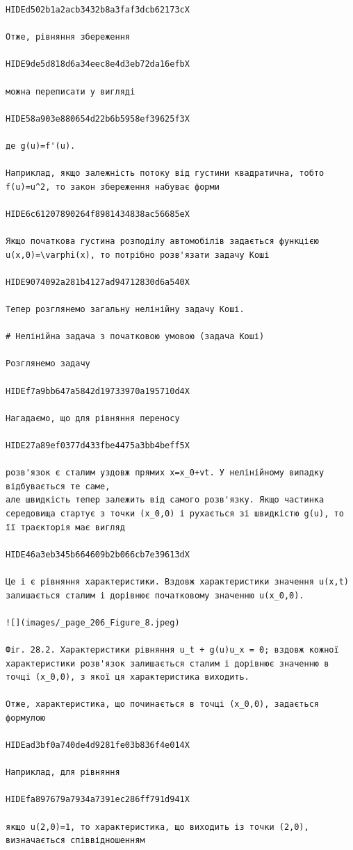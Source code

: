 \documentclass[
  ukrainian,
]{article}
\begin{document}
\begin{verbatim}
HIDEd502b1a2acb3432b8a3faf3dcb62173cX

Отже, рівняння збереження

HIDE9de5d818d6a34eec8e4d3eb72da16efbX

можна переписати у вигляді

HIDE58a903e880654d22b6b5958ef39625f3X

де g(u)=f'(u).

Наприклад, якщо залежність потоку від густини квадратична, тобто
f(u)=u^2, то закон збереження набуває форми

HIDE6c61207890264f8981434838ac56685eX

Якщо початкова густина розподілу автомобілів задається функцією
u(x,0)=\varphi(x), то потрібно розв'язати задачу Коші

HIDE9074092a281b4127ad94712830d6a540X

Тепер розглянемо загальну нелінійну задачу Коші.

# Нелінійна задача з початковою умовою (задача Коші)

Розглянемо задачу

HIDEf7a9bb647a5842d19733970a195710d4X

Нагадаємо, що для рівняння переносу

HIDE27a89ef0377d433fbe4475a3bb4beff5X

розв'язок є сталим уздовж прямих x=x_0+vt. У нелінійному випадку відбувається те саме,
але швидкість тепер залежить від самого розв'язку. Якщо частинка середовища стартує з точки (x_0,0) і рухається зі швидкістю g(u), то її траєкторія має вигляд

HIDE46a3eb345b664609b2b066cb7e39613dX

Це і є рівняння характеристики. Вздовж характеристики значення u(x,t) залишається сталим і дорівнює початковому значенню u(x_0,0).

![](images/_page_206_Figure_8.jpeg)

Фіг. 28.2. Характеристики рівняння u_t + g(u)u_x = 0; вздовж кожної характеристики розв'язок залишається сталим і дорівнює значенню в точці (x_0,0), з якої ця характеристика виходить.

Отже, характеристика, що починається в точці (x_0,0), задається формулою

HIDEad3bf0a740de4d9281fe03b836f4e014X

Наприклад, для рівняння

HIDEfa897679a7934a7391ec286ff791d941X

якщо u(2,0)=1, то характеристика, що виходить із точки (2,0), визначається співвідношенням


\end{verbatim}
\end{document}
